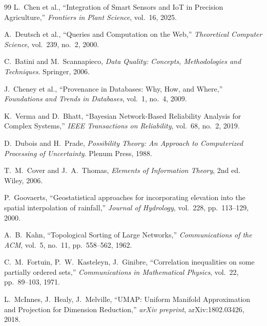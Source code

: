 \documentclass[12pt,a4paper]{article}
\theoremstyle{plain}
\theoremstyle{definition}
\theoremstyle{remark}
\begin{document}
\begin{thebibliography}{99}
L.~Chen et al.,
``Integration of Smart Sensors and IoT in Precision Agriculture,''
\textit{Frontiers in Plant Science}, vol.~16, 2025.

A.~Deutsch et al.,
``Queries and Computation on the Web,''
\textit{Theoretical Computer Science}, vol.~239, no.~2, 2000.

C.~Batini and M.~Scannapieco,
\textit{Data Quality: Concepts, Methodologies and Techniques}.
Springer, 2006.

J.~Cheney et al.,
``Provenance in Databases: Why, How, and Where,''
\textit{Foundations and Trends in Databases}, vol.~1, no.~4, 2009.

K.~Verma and D.~Bhatt,
``Bayesian Network-Based Reliability Analysis for Complex Systems,''
\textit{IEEE Transactions on Reliability}, vol.~68, no.~2, 2019.

D.~Dubois and H.~Prade,
\textit{Possibility Theory: An Approach to Computerized Processing
of Uncertainty}. Plenum Press, 1988.

T.~M.~Cover and J.~A.~Thomas,
\textit{Elements of Information Theory}, 2nd ed. Wiley, 2006.

P.~Goovaerts,
``Geostatistical approaches for incorporating elevation into the spatial
interpolation of rainfall,''
\textit{Journal of Hydrology}, vol.~228, pp.~113--129, 2000.

A.~B.~Kahn,
``Topological Sorting of Large Networks,''
\textit{Communications of the ACM}, vol.~5, no.~11, pp.~558--562, 1962.

C.~M.~Fortuin, P.~W.~Kasteleyn, J.~Ginibre,
``Correlation inequalities on some partially ordered sets,''
\textit{Communications in Mathematical Physics}, vol.~22,
pp.~89--103, 1971.

L.~McInnes, J.~Healy, J.~Melville,
``UMAP: Uniform Manifold Approximation and Projection for Dimension
Reduction,'' \textit{arXiv preprint}, arXiv:1802.03426, 2018.

\end{thebibliography}
\end{document}

